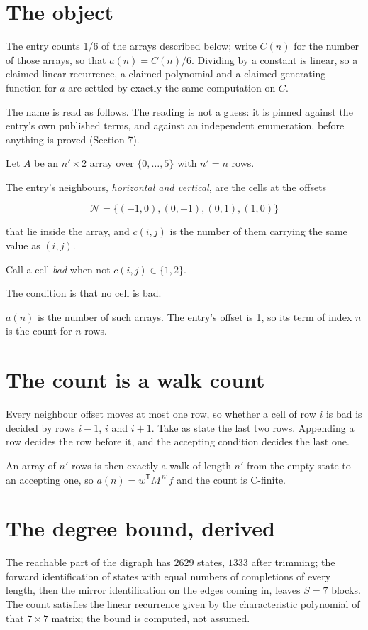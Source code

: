 \documentclass[11pt]{article}
\theoremstyle{definition}
\begin{document}
\section{The object}

The entry counts 1/6 of the arrays described below; write $C(n)$ for the number of those arrays, so that $a(n) = C(n)/6$. Dividing by a constant is linear, so a claimed linear recurrence, a claimed polynomial and a claimed generating function for $a$ are settled by exactly the same computation on $C$.

The name is read as follows. The reading is not a guess: it is pinned against the entry's own published terms, and against an independent enumeration, before anything is proved (Section 7).

Let $A$ be an $n' \times 2$ array over $\{0,\dots,5\}$ with $n' = n$ rows.

The entry's neighbours, {\itshape horizontal and vertical}, are the cells at the offsets

\[\mathcal{N} = \{(-1,0), (0,-1), (0,1), (1,0)\}\]

that lie inside the array, and $c(i,j)$ is the number of them carrying the same value as $(i,j)$.

Call a cell {\itshape bad} when not $c(i,j) \in \{1, 2\}$.

The condition is that no cell is bad.

$a(n)$ is the number of such arrays. The entry's offset is 1, so its term of index $n$ is the count for $n$ rows.

\section{The count is a walk count}

Every neighbour offset moves at most one row, so whether a cell of row $i$ is bad is decided by rows $i-1$, $i$ and $i+1$. Take as state the last two rows. Appending a row decides the row before it, and the accepting condition decides the last one.

An array of $n'$ rows is then exactly a walk of length $n'$ from the empty state to an accepting one, so $a(n) = w^{\mathsf T}M^{\,n'}f$ and the count is C-finite.

\section{The degree bound, derived}

The reachable part of the digraph has $2629$ states, $1333$ after trimming; the forward identification of states with equal numbers of completions of every length, then the mirror identification on the edges coming in, leaves $S = 7$ blocks. The count satisfies the linear recurrence given by the characteristic polynomial of that $7\times7$ matrix; the bound is computed, not assumed.
\end{document}
